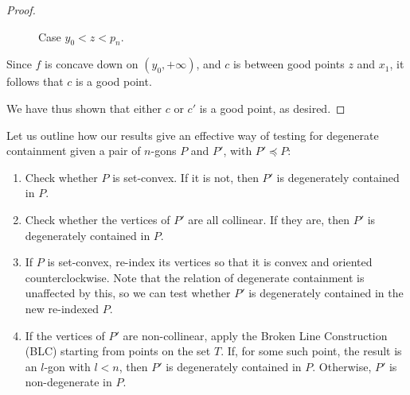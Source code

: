 \documentclass[11pt]{amsart}
\theoremstyle{remark}
\numberwithin{equation}{section}
\renewcommand{\precsim}{\preccurlyeq}
\begin{document}
\begin{proof}
\begin{figure}[h]
\centering


\caption{Case $y_0<z<p_n$.}
\label{zlessthanpn}
\end{figure}

 Since $f$ is concave down on $(y_0,+\infty)$, and   $c$ is between good points $z$ and $x_1$, it follows that $c$ is a good point.

We have thus shown that either $c$ or $c'$ is a good point, as desired.
\end{proof}



Let us outline how our results give an effective way of testing for degenerate containment given a pair of $n$-gons $P$ and $P'$, with $P'\precsim P$:
\begin{enumerate}
\item Check whether $P$ is set-convex. If it is not, then $P'$ is degenerately contained in $P$.

\item Check whether the vertices of $P'$ are all collinear. If they are, then $P'$ is degenerately contained in $P$.

\item If $P$ is set-convex, re-index its vertices so that it is convex and oriented counterclockwise. Note that the relation of degenerate containment is
unaffected by this, so we can test whether $P'$ is degenerately contained in the new re-indexed $P$.

\item If the vertices of $P'$ are non-collinear, apply the Broken Line Construction (BLC) starting from points on the set $T$. If, for some such point, the result is an $l$-gon with $l<n$, then $P'$ is degenerately contained in $P$. Otherwise, $P'$ is non-degenerate in $P$.
\end{enumerate}
\end{document}
